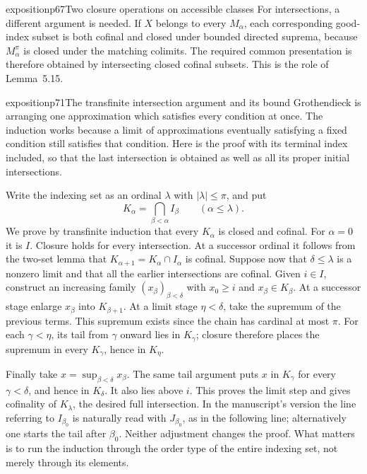 \begin{dcomment}{exposition}{p67}{Two closure operations on accessible classes}
For intersections, a different argument is needed. If $X$ belongs to every $M_\alpha$, each corresponding good-index subset is both cofinal and closed under bounded directed suprema, because $M_\alpha^\pi$ is closed under the matching colimits. The required common presentation is therefore obtained by intersecting closed cofinal subsets. This is the role of Lemma~5.15.
\end{dcomment}

\begin{dcomment}{exposition}{p71}{The transfinite intersection argument and its bound}
Grothendieck is arranging one approximation which satisfies every condition at once. The induction works because a limit of approximations eventually satisfying a fixed condition still satisfies that condition. Here is the proof with its terminal index included, so that the last intersection is obtained as well as all its proper initial intersections.

Write the indexing set as an ordinal $\lambda$ with $|\lambda|\leq\pi$, and put
\[
 K_\alpha=\bigcap_{\beta<\alpha}I_\beta\qquad(\alpha\leq\lambda).
\]
We prove by transfinite induction that every $K_\alpha$ is closed and cofinal. For $\alpha=0$ it is $I$. Closure holds for every intersection. At a successor ordinal it follows from the two-set lemma that $K_{\alpha+1}=K_\alpha\cap I_\alpha$ is cofinal. Suppose now that $\delta\leq\lambda$ is a nonzero limit and that all the earlier intersections are cofinal. Given $i\in I$, construct an increasing family $(x_\beta)_{\beta<\delta}$ with $x_0\geq i$ and $x_\beta\in K_\beta$. At a successor stage enlarge $x_\beta$ into $K_{\beta+1}$. At a limit stage $\eta<\delta$, take the supremum of the previous terms. This supremum exists since the chain has cardinal at most $\pi$. For each $\gamma<\eta$, its tail from $\gamma$ onward lies in $K_\gamma$; closure therefore places the supremum in every $K_\gamma$, hence in $K_\eta$.

Finally take $x=\sup_{\beta<\delta}x_\beta$. The same tail argument puts $x$ in $K_\gamma$ for every $\gamma<\delta$, and hence in $K_\delta$. It also lies above $i$. This proves the limit step and gives cofinality of $K_\lambda$, the desired full intersection. In the manuscript's version the line referring to $I_{\beta_0}$ is naturally read with $J_{\beta_0}$, as in the following line; alternatively one starts the tail after $\beta_0$. Neither adjustment changes the proof. What matters is to run the induction through the order type of the entire indexing set, not merely through its elements.


\end{dcomment}
